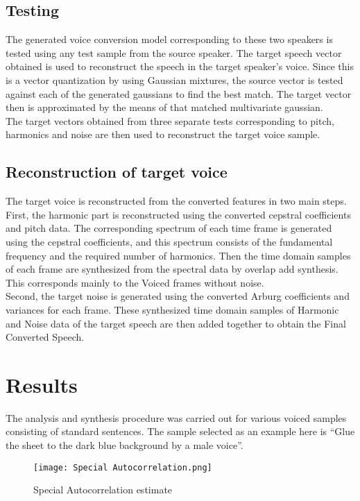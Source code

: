 \documentclass[BTech]{nitkdiss}
\begin{document}
\section{Testing}

The generated voice conversion model corresponding to these two speakers is tested using any test sample from the source speaker. The target speech vector obtained is used to reconstruct the speech in the target speaker's voice. Since this is a vector quantization by using Gaussian mixtures, the source vector is tested against each of the generated gaussians to find the best match. The target vector then is approximated by the means of that matched multivariate gaussian.\bigskip\\
The target vectors obtained from three separate tests corresponding to pitch, harmonics and noise are then used to reconstruct the target voice sample.

\section{Reconstruction of target voice}

The target voice is reconstructed from the converted features in two main steps. First, the harmonic part is reconstructed using the converted  cepstral coefficients and pitch data. The corresponding spectrum of each time frame is generated using the cepstral coefficients, and this spectrum consists of the fundamental frequency and the required number of harmonics. Then the time domain samples of each frame are synthesized from the spectral data by overlap add synthesis. This corresponds mainly to the Voiced frames without noise.\bigskip\\
Second, the target noise is generated using the converted Arburg coefficients and variances for each frame. These synthesized time domain samples of Harmonic and Noise data of the target speech are then added together to obtain the Final Converted Speech.

\chapter{\vspace{10px} Results}

The analysis and synthesis procedure was carried out for various voiced samples consisting of standard sentences. The sample selected as an example here is ``Glue the sheet to the dark blue background by a male voice''.

\begin{figure}[H]
\centering
\texttt{[image: Special Autocorrelation.png]}
\caption{Special Autocorrelation estimate}
\end{figure}
\end{document}
